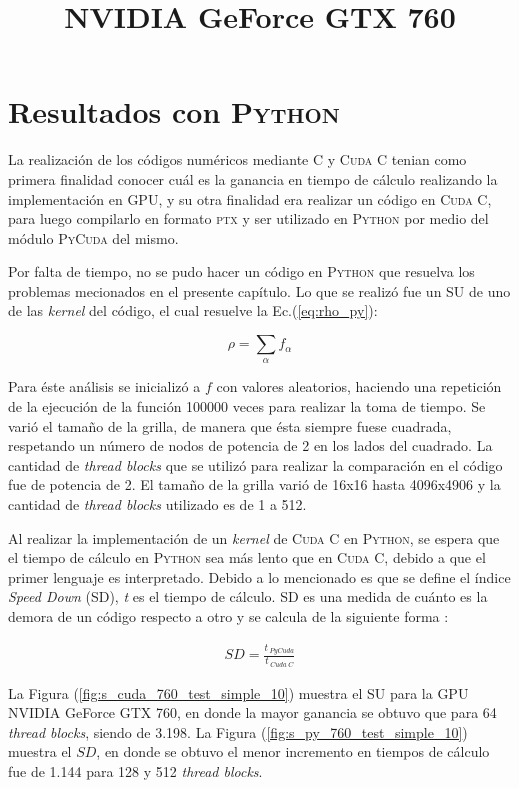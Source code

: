 \section{Resultados con \textsc{Python}}

La realización de los códigos numéricos mediante \textsc{C} y \textsc{Cuda C} tenian como primera finalidad conocer cuál es la ganancia en tiempo de cálculo realizando la implementación en GPU, y su otra finalidad era  realizar un código en \textsc{Cuda C}, para luego compilarlo en formato \textsc{ptx} y ser utilizado en \textsc{Python} por medio del módulo \textsc{PyCuda} del mismo.

Por falta de tiempo, no se pudo hacer un código en \textsc{Python} que resuelva los problemas mecionados en el presente capítulo. Lo que se realizó fue un SU 
de uno de las \textit{kernel} del código, el cual resuelve la Ec.(\ref{eq:rho_py}):

\begin{equation}
\rho = \sum_{\alpha} f_{\alpha}
\label{eq:rho_py}
\end{equation}

Para éste análisis se inicializó a $f$ con valores aleatorios, haciendo una repetición de la ejecución de la función 100000 veces para realizar la toma de tiempo. Se varió el tamaño de la grilla, de manera que ésta siempre fuese cuadrada, respetando un número de nodos de potencia de 2 en los lados del cuadrado. La cantidad de \textit{thread blocks} que se utilizó para realizar la comparación en el código fue de potencia de 2. El tamaño de la grilla varió de 16x16 hasta 4096x4906 y la cantidad de \textit{thread blocks} utilizado es de 1 a 512.

\newpage

Al  realizar la implementación de un \textit{kernel} de \textsc{Cuda C} en \textsc{Python}, se espera que el tiempo de cálculo en \textsc{Python} sea más lento que en \textsc{Cuda C}, debido a que el primer lenguaje es interpretado. Debido a lo mencionado es que se define el índice \textit{Speed Down} (SD), \textit{t} es el tiempo de cálculo. SD es una medida de cuánto es la demora de un código respecto a otro y se calcula de la siguiente forma :

\begin{align}
	SD = \frac{t_{\>PyCuda}}{t_{\>Cuda \> C}} 
\end{align} 


\title{\textbf{NVIDIA GeForce GTX 760}}

La Figura (\ref{fig:s_cuda_760_test_simple_10}) muestra el SU para la GPU NVIDIA GeForce GTX 760, en donde la mayor ganancia se obtuvo que para 64 \textit{thread blocks}, siendo de 3.198. La Figura (\ref{fig:s_py_760_test_simple_10}) muestra el $SD$, en donde se obtuvo el menor incremento en tiempos de cálculo fue de 1.144 para 128 y 512  \textit{thread blocks}. \\

